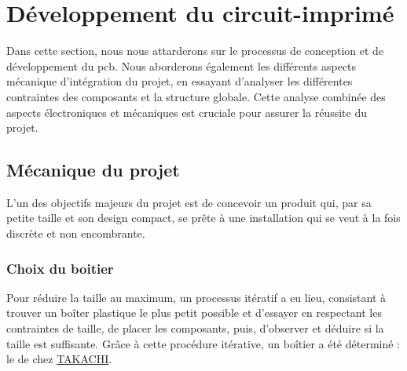 \section{Développement du circuit-imprimé} \label{sec:Dev-PCB}
Dans cette section, nous nous attarderons sur le processus de conception et de développement du \gls{pcb}. Nous aborderons également les différents aspects mécanique d'intégration du projet, en essayant d'analyser les différentes contraintes des composants et la structure globale. Cette analyse combinée des aspects électroniques et mécaniques est cruciale pour assurer la réussite du projet.

\clearpage

\subsection{Mécanique du projet} \label{ssec:mechProjet}
L'un des objectifs majeurs du projet est de concevoir un produit qui, par sa petite taille et son design compact, se prête à une installation qui se veut à la fois discrète et non encombrante.
 
\subsubsection{Choix du boitier}
Pour réduire la taille au maximum, un processus itératif a eu lieu, consistant à trouver un boîter plastique le plus petit possible et d'essayer en respectant les contraintes de taille, de placer les composants, puis, d'observer et déduire si la taille est suffisante. Grâce à cette procédure itérative, un boîtier a été déterminé : le  de chez \href{https://www.takachi-enclosure.com/products/SIC}{TAKACHI}.

